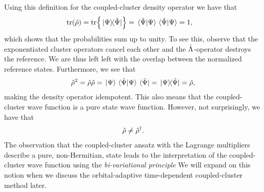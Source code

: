             Using this definition for the coupled-cluster density operator we
            have that
            \begin{align}
                \tr(\density)
                &= \tr{\dyad*{\Psi}{\tilde{\Psi}}}
                = \bra*{\tilde{\Psi}}\ket*{\Psi}
                \bra*{\tilde{\Psi}}\ket*{\Psi}
                = 1,
            \end{align}
            which shows that the probabilities sum up to unity.
            To see this, observe that the exponentiated cluster operators cancel
            each other and the $\hat{\Lambda}$-operator destroys the reference.
            We are thus left left with the overlap between the normalized
            reference states.
            Furthermore, we see that
            \begin{align}
                \density^2
                = \density\density
                = \ket*{\Psi}\braket*{\tilde{\Psi}}{\Psi}
                \bra*{\tilde{\Psi}}
                = \dyad*{\Psi}{\tilde{\Psi}}
                = \density,
            \end{align}
            making the density operator idempotent.
            This also means that the coupled-cluster wave function is a pure
            state wave function.
            However, not surprisingly, we have that
            \begin{align}
                \hat{\rho} \neq \hat{\rho}^{\dagger}.
            \end{align}
            The observation that the coupled-cluster ansatz with the Lagrange
            multipliers describe a pure, non-Hermitian, state leads to the
            interpretation of the coupled-cluster wave function using the
            \emph{bi-variational principle} \cite{arponen1983311, lowdin-bi,
            kvaal2012ab, kvaal2013variational}
            We will expand on this notion when we discuss the orbital-adaptive
            time-dependent coupled-cluster method later.

